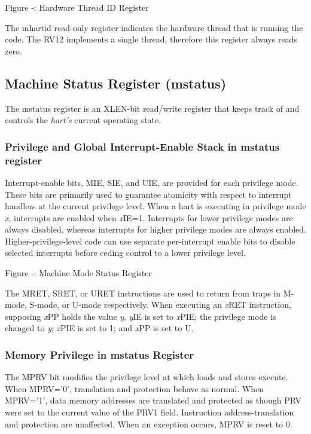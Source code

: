 Figure ‑: Hardware Thread ID Register

The mhartid read-only register indicates the hardware thread that is
running the code. The RV12 implements a single thread, therefore this
register always reads zero.

\subsection{Machine Status Register
(mstatus)}\label{machine-status-register-mstatus}

The mstatus register is an XLEN-bit read/write register that keeps track
of and controls the \emph{hart's} current operating state.

\subsubsection{Privilege and Global Interrupt-Enable Stack in mstatus register}

Interrupt-enable bits, MIE, SIE, and UIE, are provided for each
privilege mode. These bits are primarily used to guarantee atomicity
with respect to interrupt handlers at the current privilege level. When
a hart is executing in privilege mode \emph{x}, interrupts are enabled
when \emph{x}IE=1. Interrupts for lower privilege modes are always
disabled, whereas interrupts for higher privilege modes are always
enabled. Higher-privilege-level code can use separate per-interrupt
enable bits to disable selected interrupts before ceding control to a
lower privilege level.

\missingfigure{}

Figure ‑: Machine Mode Status Register

The MRET, SRET, or URET instructions are used to return from traps in
M-mode, S-mode, or U-mode respectively. When executing an \emph{x}RET
instruction, supposing \emph{x}PP holds the value \emph{y}, \emph{y}IE
is set to \emph{x}PIE; the privilege mode is changed to \emph{y};
\emph{x}PIE is set to 1; and \emph{x}PP is set to U.

\subsubsection{Memory Privilege in mstatus Register
}\label{memory-privilege-in-mstatus-register}

The MPRV bit modifies the privilege level at which loads and stores
execute. When MPRV='0', translation and protection behave as normal.
When MPRV='1', data memory addresses are translated and protected as
though PRV were set to the current value of the PRV1 field. Instruction
address-translation and protection are unaffected. When an exception
occurs, MPRV is reset to 0.

